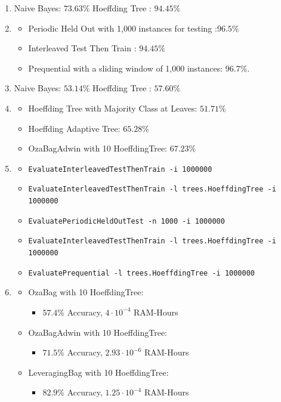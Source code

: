 \documentclass[a4paper,12pt]{article}
\begin{document}
\begin{enumerate}
 \item Naive Bayes: $73.63\%$ Hoeffding Tree : $ 94.45\%$
 \item \begin{itemize}
        \item Periodic Held Out with 1,000 instances for testing :$96.5\%$
	\item Interleaved Test Then Train : $ 94.45\%$
	\item Prequential with a sliding window of 1,000 instances: $96.7\%$.
       \end{itemize}
\item Naive Bayes: $53.14\%$ Hoeffding Tree : $57.60\%$
\item \begin{itemize}
       \item Hoeffding Tree with Majority Class at Leaves: $51.71\%$
       \item Hoeffding Adaptive Tree: $65.28\%$
	\item OzaBagAdwin with 10 HoeffdingTree: $67.23\%$
      \end{itemize}
\item \begin{itemize}
        \item \texttt{EvaluateInterleavedTestThenTrain -i 1000000}
	\item \texttt{EvaluateInterleavedTestThenTrain -l trees.HoeffdingTree -i 1000000}
	\item \texttt{EvaluatePeriodicHeldOutTest -n 1000 -i 1000000}
	\item \texttt{EvaluateInterleavedTestThenTrain -l trees.HoeffdingTree -i 1000000}
	\item \texttt{EvaluatePrequential -l trees.HoeffdingTree -i 1000000}
       \end{itemize}
\item \begin{itemize}
 \item
 OzaBag with 10 HoeffdingTree:
\begin{itemize} \item  
$57.4\%$ Accuracy, $4 \cdot 10^{-4}$ RAM-Hours
\end{itemize}
 \item
 OzaBagAdwin with 10 HoeffdingTree: 
\begin{itemize} \item  
$71.5\%$ Accuracy, $2.93 \cdot 10^{-6}$ RAM-Hours
\end{itemize}
 \item
 LeveragingBag with 10 HoeffdingTree:
\begin{itemize} \item 
 $82.9\%$ Accuracy, $1.25 \cdot 10^{-4}$  RAM-Hours 
 \end{itemize}
\end{itemize}

\end{enumerate}
\end{document}
